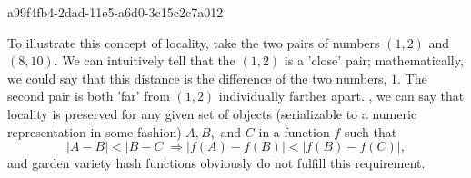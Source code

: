 \documentclass[12pt]{article}
\begin{document}
a99f4fb4-2dad-11e5-a6d0-3c15c2c7a012\par To illustrate this concept of locality, take the two pairs of numbers $(1,2)$ and $(8,10)$. We can intuitively tell that the $(1,2)$ is a 'close' pair; mathematically, we could say that this distance is the difference of the two numbers, $1$. The second pair is both 'far' from $(1,2)$ individually farther apart. , we can say that locality is preserved for any given set of objects (serializable to a numeric representation in some fashion) $A,B,$ and $C$ in a function $f$ such that
\begin{equation}
|A-B| < |B-C| \Rightarrow |f(A)-f(B)| < |f(B) - f(C)|,
\end{equation}
and garden variety hash functions obviously do not fulfill this requirement.

\printbibliography
\end{document}
